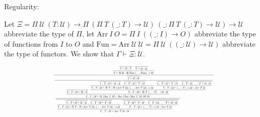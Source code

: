 \documentclass[11pt, twoside, reqno]{book}
\begin{document}
Regularity:

\begin{landscape}

Let $\Xi = \Pi\ \mathcal{U}\ (T : \mathcal{U}) \to \Pi\ (\Pi\ T\ (\_ : T) \to \mathcal{U})\ (\_ : \Pi\ T\ (\_ : T) \to \mathcal{U}) \to \mathcal{U}$ abbreviate the type of $\Pi$, let $\text{Arr}\ I\ O = \Pi\ I\ ((\_ : I) \to O)$ abbreviate the type of functions from $I$ to $O$ and $\text{Fun} = \text{Arr}\ \mathcal{U}\ \mathcal{U} = \Pi\ \mathcal{U}\ ((\_ : \mathcal{U}) \to \mathcal{U})$ abbreviate the type of functors. We show that $\Gamma \vdash \Xi : \mathcal{U}$.

\begin{displaymath}
\scalebox{0.4}{
\prftree{
  \prftree
    {\prftree{\Gamma \vdash \Pi : \Xi}}
    {\prftree{\Gamma \vdash \mathcal{U} : \mathcal{U}}}
    {\Gamma \vdash \Pi\ \mathcal{U} : \Pi\ \text{Fun}\ (\_ : \text{Fun}) \to \mathcal{U}}
}{
  \prftree
  {\prftree{\Gamma \vdash \mathcal{U} : \mathcal{U}}}
  {\prftree
    {\prftree
      {\prftree{\Gamma,\ T : \mathcal{U} \vdash \Pi : \Xi}}
      {\prftree
        {\prftree
          {\prftree{\Gamma,\ T : \mathcal{U} \vdash \Pi : \Xi}}
          {\prftree{\Gamma,\ T : \mathcal{U} \vdash T : \mathcal{U}}}
          {\Gamma,\ T : \mathcal{U} \vdash \Pi\ T : \Pi\ (\text{Arr}\ T\ \mathcal{U})\ (\_ : \text{Arr}\ T\ \mathcal{U}) \to \mathcal{U}}
        }
        {\prftree
          {\prftree{\Gamma,\ T : \mathcal{U} \vdash T : \mathcal{U}}}
          {\prftree{\Gamma,\ T : \mathcal{U},\ \_ : T \vdash \mathcal{U} : \mathcal{U}}}
          {\Gamma,\ T : \mathcal{U} \vdash (\_ : T) \to \mathcal{U} : \text{Arr}\ T\ \mathcal{U}}
        }
        {\Gamma,\ T : \mathcal{U} \vdash \Pi\ T\ (\_ : T) \to \mathcal{U} : \mathcal{U}}
      }
      {\Gamma,\ T : \mathcal{U} \vdash \Pi\ (\text{Arr}\ T\ \mathcal{U}) : \text{Arr}\ (\text{Arr}\ (\text{Arr}\ T\ \mathcal{U})\ \mathcal{U})\ \mathcal{U}}
    }
    {\prftree
      {\prftree
        {\prftree
          {\prftree{\Gamma,\ T : \mathcal{U} \vdash \Pi : \Xi}}
          {\prftree{\Gamma,\ T : \mathcal{U} \vdash T : \mathcal{U}}}
          {\Gamma,\ T : \mathcal{U} \vdash \Pi\ T : \Pi\ (\text{Arr}\ T\ \mathcal{U})\ (\_ : \text{Arr}\ T\ \mathcal{U}) \to \mathcal{U}}
        }
        {\prftree
          {\prftree{\Gamma,\ T : \mathcal{U} \vdash T : \mathcal{U}}}
          {\prftree{\Gamma,\ T : \mathcal{U},\ \_ : T \vdash \mathcal{U} : \mathcal{U}}}
          {\Gamma,\ T : \mathcal{U} \vdash (\_ : T) \to \mathcal{U} : \text{Arr}\ T\ \mathcal{U}}
        }
        {\Gamma,\ T : \mathcal{U} \vdash \text{Arr}\ T\ \mathcal{U} : \mathcal{U}}
}}}}}
\end{displaymath}
\end{landscape}
\end{document}
